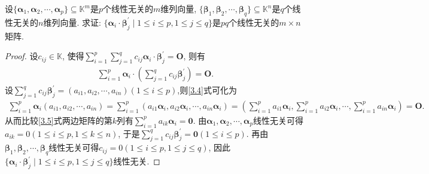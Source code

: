 \documentclass[../../main.tex]{subfiles}
\begin{document}
\begin{proposition}\label{proposition:线性无关的向量组与另一个转置的乘积积生成的矩阵也线性无关}
设\(\{\boldsymbol{\alpha}_{1},\boldsymbol{\alpha}_{2},\cdots,\boldsymbol{\alpha}_{p}\}\subseteq\mathbb{K}^{m}\)是\(p\)个线性无关的\(m\)维列向量, \(\{\boldsymbol{\beta}_{1},\boldsymbol{\beta}_{2},\cdots,\boldsymbol{\beta}_{q}\}\subseteq\mathbb{K}^{n}\)是\(q\)个线性无关的\(n\)维列向量. 求证: \(\{\boldsymbol{\alpha}_{i}\cdot\boldsymbol{\beta}_{j}^{\prime}\mid1\leq i\leq p,1\leq j\leq q\}\)是\(pq\)个线性无关的\(m\times n\)矩阵.
\end{proposition}
\begin{proof}
设\(c_{ij}\in\mathbb{K}\), 使得\(\sum_{i = 1}^{p}\sum_{j = 1}^{q}c_{ij}\boldsymbol{\alpha}_{i}\cdot\boldsymbol{\beta}_{j}^{\prime}=\boldsymbol{O}\), 则有
\begin{align}
\sum_{i = 1}^{p}\boldsymbol{\alpha}_{i}\cdot\left(\sum_{j = 1}^{q}c_{ij}\boldsymbol{\beta}_{j}^{\prime}\right)=\boldsymbol{O}.\label{3.4}
\end{align}
设\(\sum_{j = 1}^{q}c_{ij}\boldsymbol{\beta}_{j}^{\prime}=(a_{i1},a_{i2},\cdots,a_{in})(1\leq i\leq p)\),则\eqref{3.4}式可化为
\begin{align}\label{3.5}
\sum_{i=1}^p{\boldsymbol{\alpha }_i\left( a_{i1},a_{i2},\cdots ,a_{in} \right)}=\sum_{i=1}^p{\left( a_{i1}\boldsymbol{\alpha }_i,a_{i2}\boldsymbol{\alpha }_i,\cdots ,a_{in}\boldsymbol{\alpha }_i \right)}=\left( \sum_{i=1}^p{a_{i1}\boldsymbol{\alpha }_i},\sum_{i=1}^p{a_{i2}\boldsymbol{\alpha }_i},\cdots ,\sum_{i=1}^p{a_{in}\boldsymbol{\alpha }_i} \right) =\boldsymbol{O}.
\end{align}
从而比较\eqref{3.5}式两边矩阵的第\(k\)列有\(\sum_{i = 1}^{p}a_{ik}\boldsymbol{\alpha}_{i}=\boldsymbol{0}\). 由\(\boldsymbol{\alpha}_{1},\boldsymbol{\alpha}_{2},\cdots,\boldsymbol{\alpha}_{p}\)线性无关可得\(a_{ik}=0(1\leq i\leq p,1\leq k\leq n)\), 于是\(\sum_{j = 1}^{q}c_{ij}\boldsymbol{\beta}_{j}^{\prime}=\boldsymbol{0}(1\leq i\leq p)\). 再由\(\boldsymbol{\beta}_{1},\boldsymbol{\beta}_{2},\cdots,\boldsymbol{\beta}_{q}\)线性无关可得\(c_{ij}=0(1\leq i\leq p,1\leq j\leq q)\), 因此\(\{\boldsymbol{\alpha}_{i}\cdot\boldsymbol{\beta}_{j}^{\prime}\mid1\leq i\leq p,1\leq j\leq q\}\)线性无关. 
\end{proof}
\end{document}
